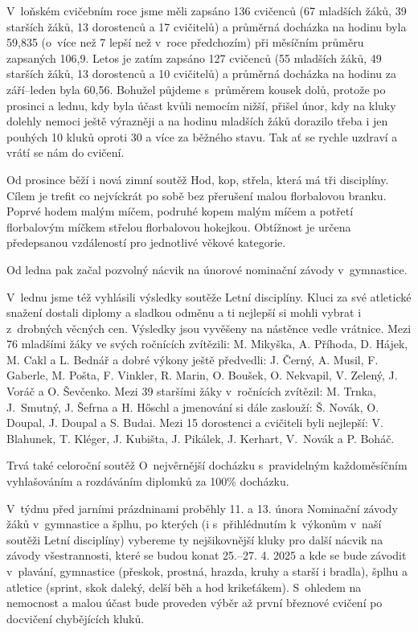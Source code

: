 \documentclass[11pt]{article}
\begin{document}
V~loňském cvičebním roce jsme měli zapsáno 136 cvičenců (67 mladších žáků, 39 starších žáků, 13 dorostenců a 17 cvičitelů) a průměrná docházka na hodinu byla 59,835 (o~více než 7 lepší než v~roce předchozím) při měsíčním průměru zapsaných 106,9. Letos je zatím zapsáno 127 cvičenců (55 mladších žáků, 49 starších žáků, 13 dorostenců a 10 cvičitelů) a průměrná docházka na hodinu za září–leden byla 60,56. Bohužel půjdeme s~průměrem kousek dolů, protože po prosinci a lednu, kdy byla účast kvůli nemocím nižší, přišel únor, kdy na kluky dolehly nemoci ještě výrazněji a na hodinu mladších žáků dorazilo třeba i jen pouhých 10 kluků oproti 30 a více za běžného stavu. Tak ať se rychle uzdraví a vrátí se nám do cvičení.

Od prosince běží i nová zimní soutěž Hod, kop, střela, která má tři disciplíny. Cílem je trefit co nejvíckrát po sobě bez přerušení malou florbalovou branku. Poprvé hodem malým míčem, podruhé kopem malým míčem a potřetí florbalovým míčkem střelou florbalovou hokejkou. Obtížnost je určena předepsanou vzdáleností pro jednotlivé věkové kategorie. 

Od ledna pak začal pozvolný nácvik na únorové nominační závody v~gymnastice. 

V~lednu jsme též vyhlásili výsledky soutěže Letní disciplíny. Kluci za své atletické snažení dostali diplomy a sladkou odměnu a ti nejlepší si mohli vybrat i z~drobných věcných cen. Výsledky jsou vyvěšeny na nástěnce vedle vrátnice. Mezi 76 mladšími žáky ve svých ročnících zvítězili: M. Mikyška, A. Příhoda, D. Hájek, M. Cakl a L. Bednář a dobré výkony ještě předvedli: J. Černý, A. Musil, F. Gaberle, M. Pošta, F. Vinkler, R. Marin, O. Boušek, O. Nekvapil, V. Zelený, J. Voráč a O. Ševčenko. Mezi 39 staršími žáky v~ročnících zvítězil: M. Trnka, J.~Smutný, J. Šefrna a H. Hőschl a jmenování si dále zaslouží: Š. Novák, O. Doupal, J. Doupal a S. Budai. Mezi 15 dorostenci a cvičiteli byli nejlepší: V. Blahunek, T. Kléger, J. Kubišta, J. Pikálek, J. Kerhart, V.~Novák a P. Boháč.

{\sloppy
Trvá také celoroční soutěž O~nejvěrnější docházku s~pravidelným každoměsíčním vyhlašováním a rozdáváním diplomků za 100\% docházku.}

V~týdnu před jarními prázdninami proběhly 11. a 13. února Nominační závody žáků v~gymnastice a šplhu, po kterých (i s~přihlédnutím k~výkonům v~naší soutěži Letní disciplíny) vybereme ty nejšikovnější kluky pro další nácvik na závody všestrannosti, které se budou konat 25.–27. 4. 2025 a kde se bude závodit v~plavání, gymnastice (přeskok, prostná, hrazda, kruhy a starší i bradla), šplhu a atletice (sprint, skok daleký, delší běh a hod krikeťákem). S~ohledem na nemocnost a malou účast bude proveden výběr až první březnové cvičení po docvičení chybějících kluků.
\end{document}

